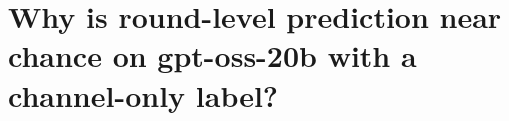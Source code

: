 \section{Why is round-level prediction near chance on gpt-oss-20b with a channel-only label?}
\label{app:gptoss-round}

